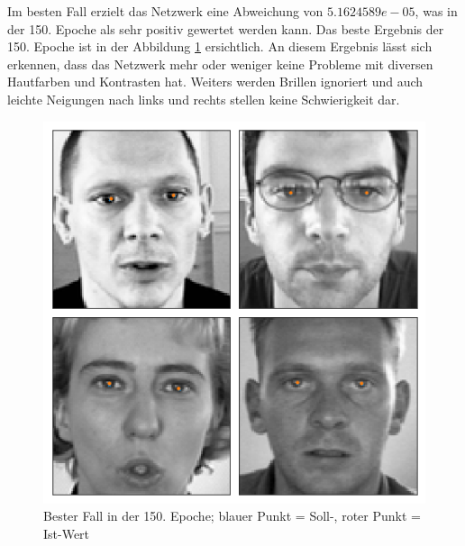 \noindent
Im besten Fall erzielt das Netzwerk eine Abweichung von $5.1624589e-05$, was in der 150. Epoche als sehr positiv gewertet werden kann.
Das beste Ergebnis der 150. Epoche ist in der Abbildung \ref{fig:good} ersichtlich. 
An diesem Ergebnis lässt sich erkennen, dass das Netzwerk mehr oder weniger keine Probleme mit diversen Hautfarben und Kontrasten hat. 
Weiters werden Brillen ignoriert und auch leichte Neigungen nach links und rechts stellen keine Schwierigkeit dar. 
\begin{figure}[ht!]
	\centering
	\includegraphics[scale=0.6]{images/Good_2.png}
	\caption{Bester Fall in der 150. Epoche; blauer Punkt = Soll-, roter Punkt = Ist-Wert}
	\label{fig:good}
\end{figure} \phantom \newline

